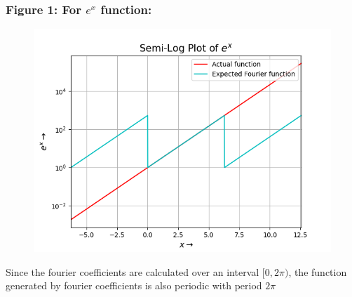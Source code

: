 \documentclass[12pt, a4paper]{article}
\begin{document}
\subsubsection{Figure 1: For $e^{x}$ function:}
    \begin{figure}[H]
        \centering
        \includegraphics[scale = 0.8]{Figure_1.png}
        \label{fig:sample}
    \end{figure}
    \vspace*{-0.5cm}
\begin{center}
    Since the fourier coefficients are calculated over an interval $[0,2\pi)$, the function generated by fourier coefficients is also periodic with period $2\pi$
\end{center}
\end{document}
